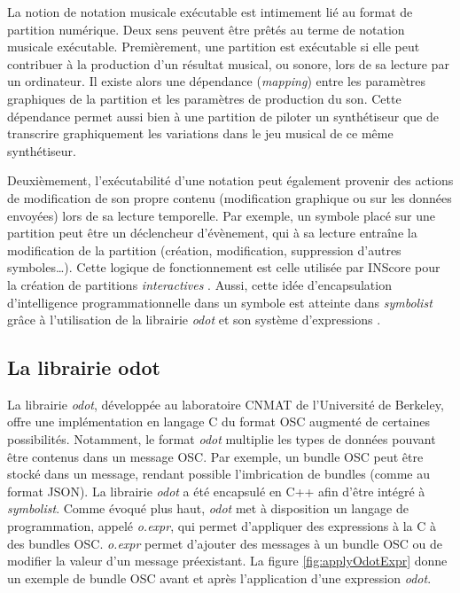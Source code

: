 La notion de notation musicale exécutable est intimement lié au format de partition numérique. Deux sens peuvent être prêtés au terme de notation musicale exécutable. 
Premièrement, une partition est exécutable si elle peut contribuer à la production d'un résultat musical, ou sonore, lors de sa lecture par un ordinateur. Il existe alors une dépendance (\textit{mapping}) entre les paramètres graphiques de la partition et les paramètres de production du son. Cette dépendance permet aussi bien à une partition de piloter un synthétiseur que de transcrire graphiquement les variations dans le jeu musical de ce même synthétiseur.

Deuxièmement, l'exécutabilité d'une notation peut également provenir des actions de modification de son propre contenu (modification graphique ou sur les données envoyées) lors de sa lecture temporelle. Par exemple, un  symbole placé sur une partition peut être un déclencheur d'évènement, qui à sa lecture entraîne la modification de la partition (création, modification, suppression d'autres symboles…). Cette logique de fonctionnement est celle utilisée par INScore pour la création de partitions \textit{interactives} \cite{fober2017}.
Aussi, cette idée d'encapsulation d'intelligence programmationnelle dans un symbole est atteinte dans \textit{symbolist} grâce à l'utilisation de la librairie \textit{odot} et son système d'expressions \cite{maccallum2011}.

\subsection{La librairie odot}
\label{subsec:odotLibrary}
La librairie \textit{odot}, développée au laboratoire CNMAT de l'Université de Berkeley, offre une implémentation en langage C du format OSC augmenté de certaines possibilités. Notamment, le \og format \fg \textit{odot} multiplie les types de données pouvant être contenus dans un message OSC. Par exemple, un bundle OSC peut être stocké dans un message, rendant possible l'imbrication de bundles (comme au format JSON). 
La librairie \textit{odot} a été encapsulé en C++ afin d'être intégré à \textit{symbolist}. Comme évoqué plus haut, \textit{odot} met à disposition un langage de programmation, appelé \textit{o.expr}, qui permet d'appliquer des expressions \og à la C \fg à des bundles OSC. \textit{o.expr} permet d'ajouter des messages à un bundle OSC ou de modifier la valeur d'un message préexistant. La figure \ref{fig:applyOdotExpr} donne un exemple de bundle OSC avant et après l'application d'une expression \textit{odot}.

